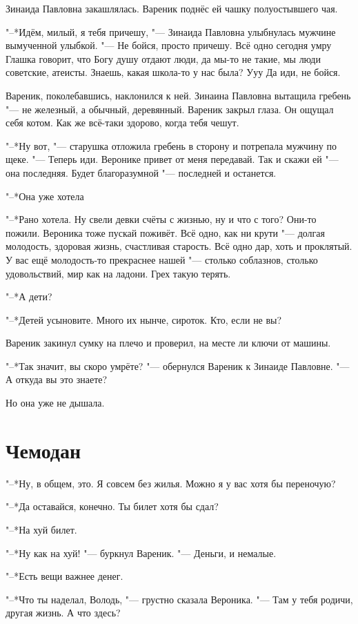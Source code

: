 Зинаида Павловна закашлялась.
Вареник поднёс ей чашку полуостывшего чая.

"--*Идём, милый, я тебя причешу, "--- Зинаида Павловна улыбнулась мужчине вымученной улыбкой.
"--- Не бойся, просто причешу.
Всё одно сегодня умру\ldotst
Глашка говорит, что Богу душу отдают люди, да мы-то не такие, мы люди советские, атеисты.
Знаешь, какая школа-то у нас была?
Ууу\ldotst
Да иди, не бойся.

Вареник, поколебавшись, наклонился к ней.
Зинаина Павловна вытащила гребень "--- не железный, а обычный, деревянный.
Вареник закрыл глаза.
Он ощущал себя котом.
Как же всё-таки здорово, когда тебя чешут.

"--*Ну вот, "--- старушка отложила гребень в сторону и потрепала мужчину по щеке.
"--- Теперь иди.
Веронике привет от меня передавай.
Так и скажи ей "--- она последняя.
Будет благоразумной "--- последней и останется.

"--*Она уже хотела\ldotst

"--*Рано хотела.
Ну свели девки счёты с жизнью, ну и что с того?
Они-то пожили.
Вероника тоже пускай поживёт.
Всё одно, как ни крути "--- долгая молодость, здоровая жизнь, счастливая старость.
Всё одно дар, хоть и проклятый.
У вас ещё молодость-то прекраснее нашей "--- столько соблазнов, столько удовольствий, мир как на ладони.
Грех такую терять.

"--*А дети?

"--*Детей усыновите.
Много их нынче, сироток.
Кто, если не вы?

Вареник закинул сумку на плечо и проверил, на месте ли ключи от машины.

"--*Так значит, вы скоро умрёте? "--- обернулся Вареник к Зинаиде Павловне.
"--- А откуда вы это знаете?

Но она уже не дышала.

\section{Чемодан}

"--*Ну, в общем, это.
Я совсем без жилья.
Можно я у вас хотя бы переночую?

"--*Да оставайся, конечно.
Ты билет хотя бы сдал?

"--*На хуй билет.

"--*Ну как на хуй! "--- буркнул Вареник.
"--- Деньги, и немалые.

"--*Есть вещи важнее денег.

"--*Что ты наделал, Володь, "--- грустно сказала Вероника.
"--- Там у тебя родичи, другая жизнь.
А что здесь?

